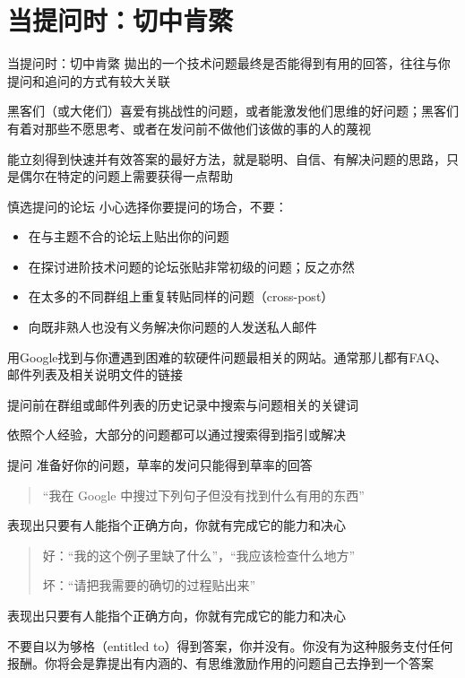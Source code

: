 \documentclass[10pt]{beamer}
\begin{document}
\section{当提问时：切中肯綮}

\begin{frame}{当提问时：切中肯綮}
    拋出的一个技术问题最终是否能得到有用的回答，往往与你提问和追问的方式有较大关联

    黑客们（或大佬们）喜爱有挑战性的问题，或者能激发他们思维的好问题；黑客们有着对那些不愿思考、或者在发问前不做他们该做的事的人的蔑视

    能立刻得到快速并有效答案的最好方法，就是聪明、自信、有解决问题的思路，只是偶尔在特定的问题上需要获得一点帮助
\end{frame}

\begin{frame}[fragile]{慎选提问的论坛}
    小心选择你要提问的场合，不要：

    \begin{itemize}
        \item 在与主题不合的论坛上贴出你的问题
        \item 在探讨进阶技术问题的论坛张贴非常初级的问题；反之亦然
        \item 在太多的不同群组上重复转贴同样的问题（cross-post）
        \item 向既非熟人也没有义务解决你问题的人发送私人邮件
    \end{itemize}

    用Google找到与你遭遇到困难的软硬件问题最相关的网站。通常那儿都有FAQ、邮件列表及相关说明文件的链接

    提问前在群组或邮件列表的历史记录中搜索与问题相关的关键词

    依照个人经验，大部分的问题都可以通过搜索得到指引或解决
\end{frame}

\begin{frame}[fragile]{提问}
    准备好你的问题，草率的发问只能得到草率的回答
    \begin{quote}
        “我在 Google 中搜过下列句子但没有找到什么有用的东西”
    \end{quote}

    表现出只要有人能指个正确方向，你就有完成它的能力和决心
    \begin{quote}
        好：“我的这个例子里缺了什么”，“我应该检查什么地方”

        坏：“请把我需要的确切的过程贴出来”
    \end{quote}

    表现出只要有人能指个正确方向，你就有完成它的能力和决心


    不要自以为够格（entitled to）得到答案，你并没有。你没有为这种服务支付任何报酬。你将会是靠提出有内涵的、有思维激励作用的问题自己去挣到一个答案
\end{frame}
\end{document}
